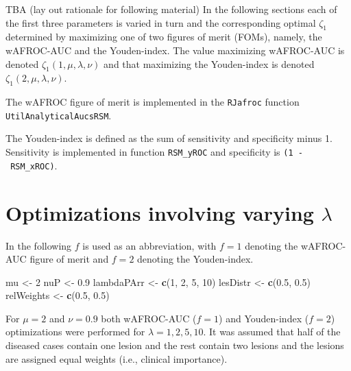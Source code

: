 \documentclass[
]{book}
\newenvironment{Shaded}{\begin{snugshade}}{\end{snugshade}}
\newcommand{\DecValTok}[1]{\textcolor[rgb]{0.00,0.00,0.81}{#1}}
\newcommand{\FloatTok}[1]{\textcolor[rgb]{0.00,0.00,0.81}{#1}}
\newcommand{\KeywordTok}[1]{\textcolor[rgb]{0.13,0.29,0.53}{\textbf{#1}}}
\newcommand{\NormalTok}[1]{#1}
\newcommand{\StringTok}[1]{\textcolor[rgb]{0.31,0.60,0.02}{#1}}
\begin{document}
TBA (lay out rationale for following material) In the following sections each of the first three parameters is varied in turn and the corresponding optimal \(\zeta_1\) determined by maximizing one of two figures of merit (FOMs), namely, the wAFROC-AUC and the Youden-index. The value maximizing wAFROC-AUC is denoted \(\zeta_{1} \left ( 1, \mu, \lambda, \nu \right )\) and that maximizing the Youden-index is denoted \(\zeta_{1} \left ( 2, \mu, \lambda, \nu \right )\).

The wAFROC figure of merit is implemented in the \texttt{RJafroc} function \texttt{UtilAnalyticalAucsRSM}.

The Youden-index is defined as the sum of sensitivity and specificity minus 1. Sensitivity is implemented in function \texttt{RSM\_yROC} and specificity is \texttt{(1\ -\ RSM\_xROC)}.

\hypertarget{optim-op-point-vary-lambda}{%
\section{\texorpdfstring{Optimizations involving varying \(\lambda\)}{Optimizations involving varying \textbackslash lambda}}\label{optim-op-point-vary-lambda}}

In the following \(f\) is used as an abbreviation, with \(f = 1\) denoting the wAFROC-AUC figure of merit and \(f = 2\) denoting the Youden-index.

\begin{Shaded}
\begin{Highlighting}[]
\NormalTok{mu <-}\StringTok{ }\DecValTok{2}
\NormalTok{nuP <-}\StringTok{ }\FloatTok{0.9}
\NormalTok{lambdaPArr <-}\StringTok{ }\KeywordTok{c}\NormalTok{(}\DecValTok{1}\NormalTok{, }\DecValTok{2}\NormalTok{, }\DecValTok{5}\NormalTok{, }\DecValTok{10}\NormalTok{)}
\NormalTok{lesDistr <-}\StringTok{ }\KeywordTok{c}\NormalTok{(}\FloatTok{0.5}\NormalTok{, }\FloatTok{0.5}\NormalTok{)}
\NormalTok{relWeights <-}\StringTok{ }\KeywordTok{c}\NormalTok{(}\FloatTok{0.5}\NormalTok{, }\FloatTok{0.5}\NormalTok{)}
\end{Highlighting}
\end{Shaded}

For \(\mu = 2\) and \(\nu = 0.9\) both wAFROC-AUC (\(f=1\)) and Youden-index (\(f = 2\)) optimizations were performed for \(\lambda = 1, 2, 5, 10\). It was assumed that half of the diseased cases contain one lesion and the rest contain two lesions and the lesions are assigned equal weights (i.e., clinical importance).
\end{document}
